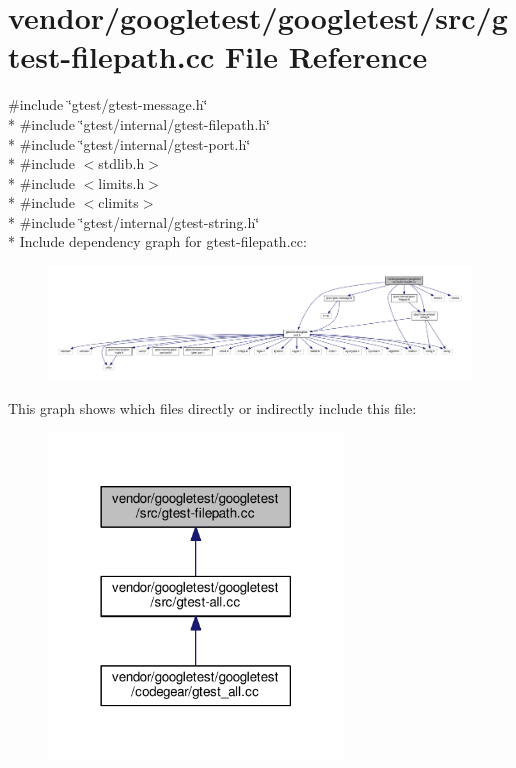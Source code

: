 \hypertarget{gtest-filepath_8cc}{}\section{vendor/googletest/googletest/src/gtest-\/filepath.cc File Reference}
\label{gtest-filepath_8cc}
{\ttfamily \#include \char`\"{}gtest/gtest-\/message.\+h\char`\"{}}\\*
{\ttfamily \#include \char`\"{}gtest/internal/gtest-\/filepath.\+h\char`\"{}}\\*
{\ttfamily \#include \char`\"{}gtest/internal/gtest-\/port.\+h\char`\"{}}\\*
{\ttfamily \#include $<$stdlib.\+h$>$}\\*
{\ttfamily \#include $<$limits.\+h$>$}\\*
{\ttfamily \#include $<$climits$>$}\\*
{\ttfamily \#include \char`\"{}gtest/internal/gtest-\/string.\+h\char`\"{}}\\*
Include dependency graph for gtest-\/filepath.cc\+:
\nopagebreak
\begin{figure}[H]
\begin{center}
\leavevmode
\includegraphics[width=350pt]{gtest-filepath_8cc__incl}
\end{center}
\end{figure}
This graph shows which files directly or indirectly include this file\+:
\nopagebreak
\begin{figure}[H]
\begin{center}
\leavevmode
\includegraphics[width=222pt]{gtest-filepath_8cc__dep__incl}
\end{center}
\end{figure}

